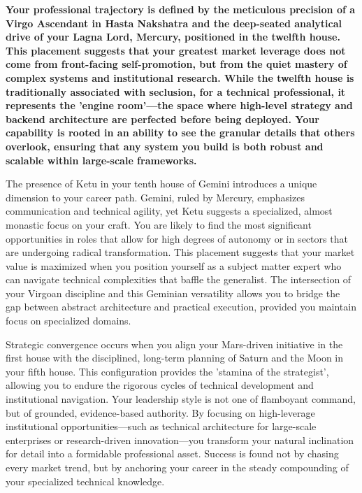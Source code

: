 {\fontsize{9.5}{13.8}\selectfont\bfseries\color{DeepSlate} Your professional trajectory is defined by the meticulous precision of a Virgo Ascendant in Hasta Nakshatra and the deep-seated analytical drive of your Lagna Lord, Mercury, positioned in the twelfth house. This placement suggests that your greatest market leverage does not come from front-facing self-promotion, but from the quiet mastery of complex systems and institutional research. While the twelfth house is traditionally associated with seclusion, for a technical professional, it represents the 'engine room'---the space where high-level strategy and backend architecture are perfected before being deployed. Your capability is rooted in an ability to see the granular details that others overlook, ensuring that any system you build is both robust and scalable within large-scale frameworks.}\par\vspace{2mm}

{\fontsize{9}{13}\selectfont The presence of Ketu in your tenth house of Gemini introduces a unique dimension to your career path. Gemini, ruled by Mercury, emphasizes communication and technical agility, yet Ketu suggests a specialized, almost monastic focus on your craft. You are likely to find the most significant opportunities in roles that allow for high degrees of autonomy or in sectors that are undergoing radical transformation. This placement suggests that your market value is maximized when you position yourself as a subject matter expert who can navigate technical complexities that baffle the generalist. The intersection of your Virgoan discipline and this Geminian versatility allows you to bridge the gap between abstract architecture and practical execution, provided you maintain focus on specialized domains.}\par\vspace{1.8mm}

{\fontsize{9}{13}\selectfont Strategic convergence occurs when you align your Mars-driven initiative in the first house with the disciplined, long-term planning of Saturn and the Moon in your fifth house. This configuration provides the 'stamina of the strategist', allowing you to endure the rigorous cycles of technical development and institutional navigation. Your leadership style is not one of flamboyant command, but of grounded, evidence-based authority. By focusing on high-leverage institutional opportunities---such as technical architecture for large-scale enterprises or research-driven innovation---you transform your natural inclination for detail into a formidable professional asset. Success is found not by chasing every market trend, but by anchoring your career in the steady compounding of your specialized technical knowledge.}\par\vspace{1.8mm}

